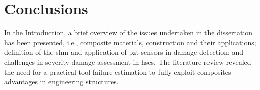 \section{Conclusions}
\label{sec:conclusionsIntro}

In the Introduction, a brief overview of the issues undertaken in the dissertation has been presented,  i.e., composite materials, construction and their applications;  definition of the \ac{shm} and application of \ac{pzt} sensors in damage detection; and challenges in severity damage assessment in \acp{hsc}.
The literature review revealed the need for a practical tool failure estimation to fully exploit composites advantages in engineering structures.